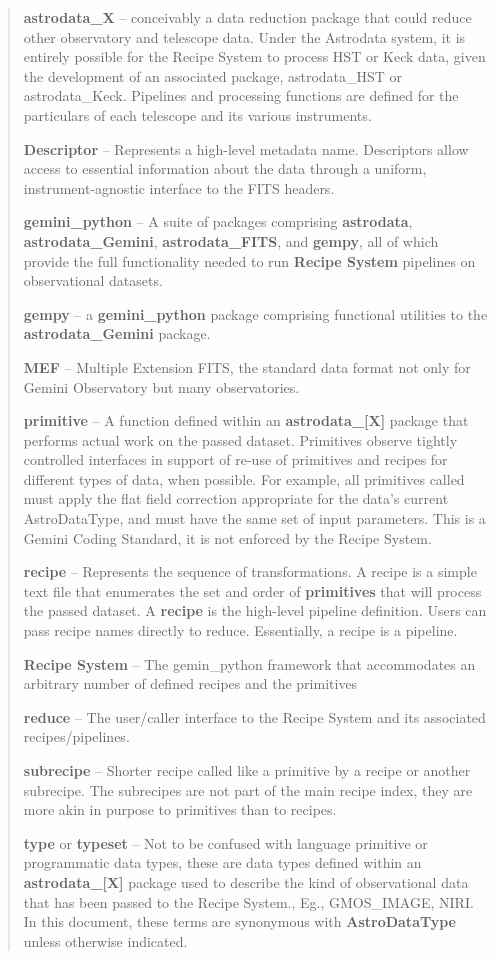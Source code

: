 \documentclass[letterpaper,10pt,english]{sphinxmanual}
\begin{document}
\begin{quote}
\textbf{astrodata\_X} -- conceivably a data reduction package that could reduce
other observatory and telescope data. Under the Astrodata system, it is
entirely possible for the Recipe System to process HST or Keck data, given
the development of an associated package, astrodata\_HST or astrodata\_Keck.
Pipelines and processing functions are defined for the particulars of each
telescope and its various instruments.

\textbf{Descriptor} -- Represents a high-level metadata name. Descriptors allow
access to essential information about the data through a uniform,
instrument-agnostic interface to the FITS headers.

\textbf{gemini\_python} -- A suite of packages comprising \textbf{astrodata},
\textbf{astrodata\_Gemini}, \textbf{astrodata\_FITS}, and \textbf{gempy}, all of which provide
the full functionality needed to run \textbf{Recipe System}  pipelines on
observational datasets.

\textbf{gempy} -- a \textbf{gemini\_python} package comprising functional utilities to
the \textbf{astrodata\_Gemini} package.

\textbf{MEF} -- Multiple Extension FITS, the standard data format not only for
Gemini Observatory but many observatories.

\textbf{primitive} -- A function defined within an \textbf{astrodata\_{[}X{]}} package that
performs actual work on the passed dataset. Primitives observe tightly
controlled interfaces in support of re-use of primitives and recipes for
different types of data, when possible. For example, all primitives called
 must apply the flat field correction appropriate for the data’s
current AstroDataType, and must have the same set of input parameters.  This
is a Gemini Coding Standard, it is not enforced by the Recipe System.

\textbf{recipe} -- Represents the sequence of transformations. A recipe is a
simple text file that enumerates the set and order of \textbf{primitives} that will
process the passed dataset. A \textbf{recipe} is the high-level pipeline definition.
Users can pass recipe names directly to reduce. Essentially, a recipe is a
pipeline.

\textbf{Recipe System} -- The gemin\_python framework that accommodates an arbitrary
number of defined recipes and the primitives

\textbf{reduce} -- The user/caller interface to the Recipe System and its associated
recipes/pipelines.

\textbf{subrecipe} -- Shorter recipe called like a primitive by a recipe or another
subrecipe.  The subrecipes are not part of the main recipe index, they are more
akin in purpose to primitives than to recipes.

\textbf{type} or \textbf{typeset} --  Not to be confused with language primitive or
programmatic data types, these are data types defined within an
\textbf{astrodata\_{[}X{]}} package used to describe the kind of observational data that
has been passed to the Recipe System., Eg., GMOS\_IMAGE, NIRI. In this document,
these terms are synonymous with \textbf{AstroDataType} unless otherwise indicated.
\end{quote}
\end{document}

